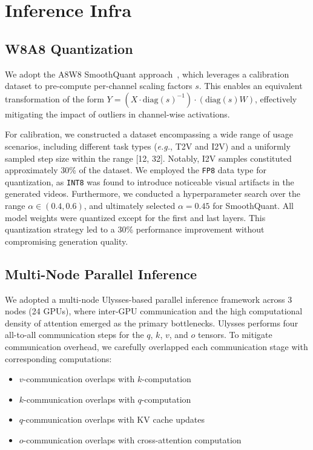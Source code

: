 
\section{Inference Infra}
\subsection{W8A8 Quantization}
\label{sec:appendix_w8a8}
We adopt the A8W8 SmoothQuant approach~\citep{xiao2023smoothquant}, which leverages a calibration dataset to pre-compute per-channel scaling factors $s$. This enables an equivalent transformation of the form $Y = (X \cdot \text{diag}(s)^{-1}) \cdot (\text{diag}(s)W)$, effectively mitigating the impact of outliers in channel-wise activations.

For calibration, we constructed a dataset encompassing a wide range of usage scenarios, including different task types (\emph{e.g.}, T2V and I2V) and a uniformly sampled step size within the range [12, 32]. Notably, I2V samples constituted approximately 30\% of the dataset. We employed the \texttt{FP8} data type for quantization, as \texttt{INT8} was found to introduce noticeable visual artifacts in the generated videos. Furthermore, we conducted a hyperparameter search over the range $\alpha \in (0.4, 0.6)$, and ultimately selected $\alpha = 0.45$ for SmoothQuant.
All model weights were quantized except for the first and last layers. This quantization strategy led to a 30\% performance improvement without compromising generation quality.


\subsection{Multi-Node Parallel Inference}
\label{sec:appendix_multinode_parallel_inference}
We adopted a multi-node Ulysses-based parallel inference framework across 3 nodes (24 GPUs), where inter-GPU communication and the high computational density of attention emerged as the primary bottlenecks.
Ulysses performs four all-to-all communication steps for the $q$, $k$, $v$, and $o$ tensors. To mitigate communication overhead, we carefully overlapped each communication stage with corresponding computations:

\begin{itemize} 
    \item $v$-communication overlaps with $k$-computation
    \item $k$-communication overlaps with $q$-computation
    \item $q$-communication overlaps with KV cache updates
    \item $o$-communication overlaps with cross-attention computation
\end{itemize}

